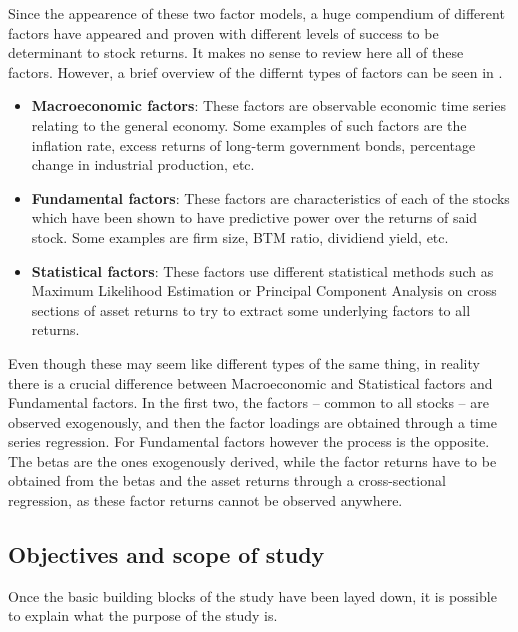 Since the appearence of these two factor models, a huge compendium of different factors have appeared and proven with different levels of success to be determinant to stock returns. It makes no sense to review here all of these factors. However, a brief overview of the differnt types of factors can be seen in \cite{connor_1995}.
\begin{itemize}
    \item \textbf{Macroeconomic factors}: These factors are observable economic time series relating to the general economy. Some examples of such factors are the inflation rate, excess returns of long-term government bonds, percentage change in industrial production, etc. 
    \item \textbf{Fundamental factors}: These factors are characteristics of each of the stocks which have been shown to have predictive power over the returns of said stock. Some examples are firm size, BTM ratio, dividiend yield, etc. 
    \item \textbf{Statistical factors}: These factors use different statistical methods such as Maximum Likelihood Estimation or Principal Component Analysis on cross sections of asset returns to try to extract some underlying factors to all returns. 
\end{itemize}
Even though these may seem like different types of the same thing, in reality there is a crucial difference between Macroeconomic and Statistical factors and Fundamental factors. In the first two, the factors -- common to all stocks -- are observed exogenously, and then the factor loadings are obtained through a time series regression. For Fundamental factors however the process is the opposite. The betas are the ones exogenously derived, while the factor returns have to be obtained from the betas and the asset returns through a cross-sectional regression, as these factor returns cannot be observed anywhere. 
\subsection{Objectives and scope of study}
Once the basic building blocks of the study have been layed down, it is possible to explain what the purpose of the study is. 

